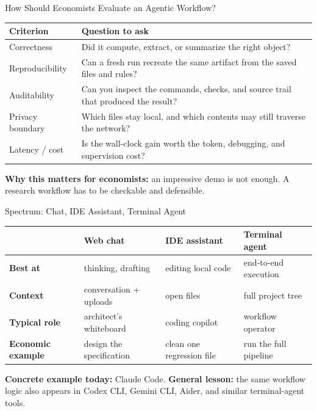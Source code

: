 \documentclass[10pt,english,aspectratio=169]{beamer}
\begin{document}
\begin{frame}{How Should Economists Evaluate an Agentic Workflow?}
\begin{center}
\small
\begin{tabular}{|p{2.2cm}|p{8.2cm}|}
\hline
\textbf{Criterion} & \textbf{Question to ask} \\ \hline
Correctness & Did it compute, extract, or summarize the right object? \\ \hline
Reproducibility & Can a fresh run recreate the same artifact from the saved files and rules? \\ \hline
Auditability & Can you inspect the commands, checks, and source trail that produced the result? \\ \hline
Privacy boundary & Which files stay local, and which contents may still traverse the network? \\ \hline
Latency / cost & Is the wall-clock gain worth the token, debugging, and supervision cost? \\ \hline
\end{tabular}
\end{center}

\vspace{0.25cm}
\textbf{Why this matters for economists:} an impressive demo is not enough. A research workflow has to be checkable and defensible.
\end{frame}

\begin{frame}{Spectrum: Chat, IDE Assistant, Terminal Agent}
\begin{center}
\small
\begin{tabular}{|p{2.5cm}|p{3.0cm}|p{3.2cm}|p{3.6cm}|}
\hline
& \textbf{Web chat} & \textbf{IDE assistant} & \textbf{Terminal agent} \\ \hline
\textbf{Best at} & thinking, drafting & editing local code & end-to-end execution \\ \hline
\textbf{Context} & conversation + uploads & open files & full project tree \\ \hline
\textbf{Typical role} & architect's whiteboard & coding copilot & workflow operator \\ \hline
\textbf{Economic example} & design the specification & clean one regression file & run the full pipeline \\ \hline
\end{tabular}
\end{center}

\vspace{0.25cm}

\textbf{Concrete example today:} Claude Code. \textbf{General lesson:} the same workflow logic also appears in Codex CLI, Gemini CLI, Aider, and similar terminal-agent tools.
\end{frame}
\end{document}
